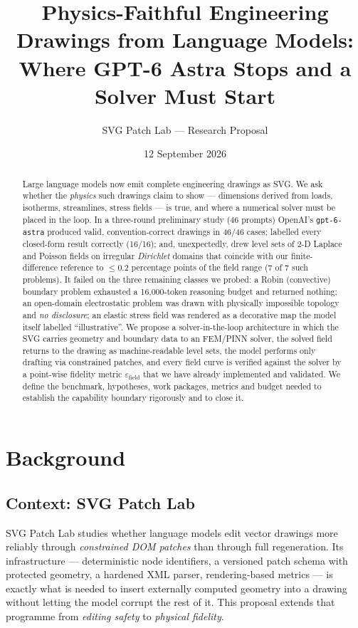 \documentclass[11pt,a4paper]{article}
\title{Physics-Faithful Engineering Drawings from Language Models:\\Where GPT-6 Astra Stops and a Solver Must Start}
\author{SVG Patch Lab --- Research Proposal}
\date{12 September 2026}
\newcommand{\astra}{\texttt{gpt-6-astra}}
\newcommand{\eps}{\varepsilon_{\mathrm{field}}}
\begin{document}
\maketitle

\begin{abstract}
Large language models now emit complete engineering drawings as SVG. We ask whether the \emph{physics} such drawings claim to show --- dimensions derived from loads, isotherms, streamlines, stress fields --- is true, and where a numerical solver must be placed in the loop. In a three-round preliminary study (46 prompts) OpenAI's \astra{} produced valid, convention-correct drawings in 46/46 cases; labelled every closed-form result correctly (16/16); and, unexpectedly, drew level sets of 2-D Laplace and Poisson fields on irregular \emph{Dirichlet} domains that coincide with our finite-difference reference to $\le 0.2$ percentage points of the field range (7 of 7 such problems). It failed on the three remaining classes we probed: a Robin (convective) boundary problem exhausted a 16{,}000-token reasoning budget and returned nothing; an open-domain electrostatic problem was drawn with physically impossible topology and \emph{no disclosure}; an elastic stress field was rendered as a decorative map the model itself labelled ``illustrative''. We propose a solver-in-the-loop architecture in which the SVG carries geometry and boundary data to an FEM/PINN solver, the solved field returns to the drawing as machine-readable level sets, the model performs only drafting via constrained patches, and every field curve is verified against the solver by a point-wise fidelity metric $\eps$ that we have already implemented and validated. We define the benchmark, hypotheses, work packages, metrics and budget needed to establish the capability boundary rigorously and to close it.
\end{abstract}

\section{Background}
\subsection{Context: SVG Patch Lab}
SVG Patch Lab studies whether language models edit vector drawings more reliably through \emph{constrained DOM patches} than through full regeneration. Its infrastructure --- deterministic node identifiers, a versioned patch schema with protected geometry, a hardened XML parser, rendering-based metrics --- is exactly what is needed to insert externally computed geometry into a drawing without letting the model corrupt the rest of it. This proposal extends that programme from \emph{editing safety} to \emph{physical fidelity}.
\end{document}
